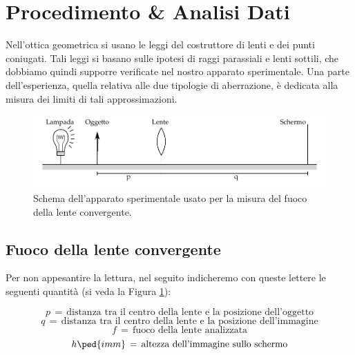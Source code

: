 \section{Procedimento \& Analisi Dati}

Nell'ottica geometrica si usano le leggi del costruttore di lenti e dei punti coniugati.
Tali leggi si basano sulle ipotesi di raggi parassiali e lenti sottili, che dobbiamo quindi supporre verificate
nel nostro apparato sperimentale. Una parte dell'esperienza, quella relativa alle due tipologie di aberrazione, è dedicata alla misura dei limiti di tali approssimazioni.

\begin{figure}[b!]
	\includegraphics[width=16cm]{drawing.pdf}
    \caption{Schema dell'apparato sperimentale usato per la misura del fuoco della lente convergente.}
    \label{fig:conv}
\end{figure}

\subsection{Fuoco della lente convergente}

Per non appesantire la lettura, nel seguito indicheremo con queste lettere le seguenti quantità (si veda la Figura \ref{fig:conv}):

\begin{equation*}
	p \,=\, \text{distanza tra il centro della lente e la posizione dell'oggetto}
\end{equation*}
\begin{equation*}
	q \,=\, \text{distanza tra il centro della lente e la posizione dell'immagine}
\end{equation*}
\begin{equation*}
	f \,=\, \text{fuoco della lente analizzata}
\end{equation*}
\begin{equation*}
	h \ped{imm} \,=\, \text{altezza dell'immagine sullo schermo}
\end{equation*}


